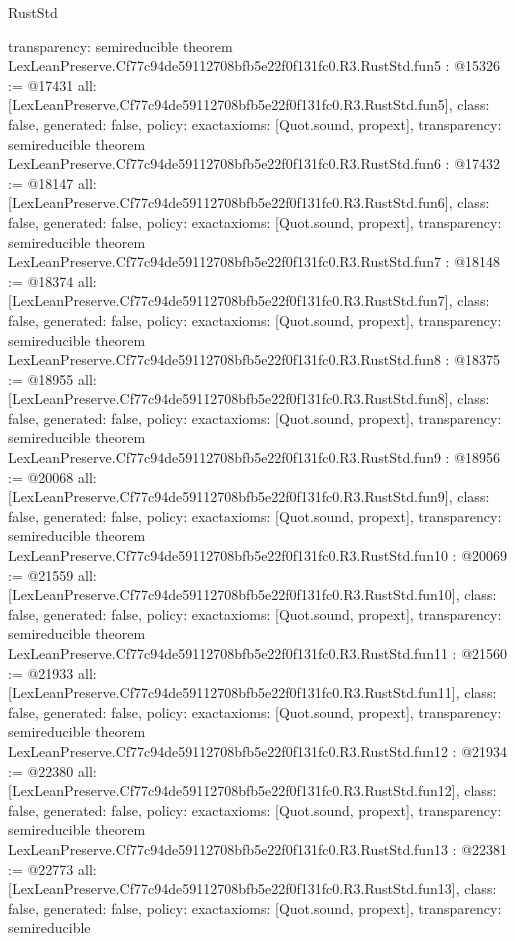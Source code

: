 \begin{lexlean}{RustStd}
\begin{coremodule}
{  transparency: semireducible
}
theorem LexLeanPreserve.Cf77c94de59112708bfb5e22f0f131fc0.R3.RustStd.fun5 : @15326 := @17431 {
  all: [LexLeanPreserve.Cf77c94de59112708bfb5e22f0f131fc0.R3.RustStd.fun5],
  class: false,
  generated: false,
  policy: exact{axioms: [Quot.sound, propext]},
  transparency: semireducible
}
theorem LexLeanPreserve.Cf77c94de59112708bfb5e22f0f131fc0.R3.RustStd.fun6 : @17432 := @18147 {
  all: [LexLeanPreserve.Cf77c94de59112708bfb5e22f0f131fc0.R3.RustStd.fun6],
  class: false,
  generated: false,
  policy: exact{axioms: [Quot.sound, propext]},
  transparency: semireducible
}
theorem LexLeanPreserve.Cf77c94de59112708bfb5e22f0f131fc0.R3.RustStd.fun7 : @18148 := @18374 {
  all: [LexLeanPreserve.Cf77c94de59112708bfb5e22f0f131fc0.R3.RustStd.fun7],
  class: false,
  generated: false,
  policy: exact{axioms: [Quot.sound, propext]},
  transparency: semireducible
}
theorem LexLeanPreserve.Cf77c94de59112708bfb5e22f0f131fc0.R3.RustStd.fun8 : @18375 := @18955 {
  all: [LexLeanPreserve.Cf77c94de59112708bfb5e22f0f131fc0.R3.RustStd.fun8],
  class: false,
  generated: false,
  policy: exact{axioms: [Quot.sound, propext]},
  transparency: semireducible
}
theorem LexLeanPreserve.Cf77c94de59112708bfb5e22f0f131fc0.R3.RustStd.fun9 : @18956 := @20068 {
  all: [LexLeanPreserve.Cf77c94de59112708bfb5e22f0f131fc0.R3.RustStd.fun9],
  class: false,
  generated: false,
  policy: exact{axioms: [Quot.sound, propext]},
  transparency: semireducible
}
theorem LexLeanPreserve.Cf77c94de59112708bfb5e22f0f131fc0.R3.RustStd.fun10 : @20069 := @21559 {
  all: [LexLeanPreserve.Cf77c94de59112708bfb5e22f0f131fc0.R3.RustStd.fun10],
  class: false,
  generated: false,
  policy: exact{axioms: [Quot.sound, propext]},
  transparency: semireducible
}
theorem LexLeanPreserve.Cf77c94de59112708bfb5e22f0f131fc0.R3.RustStd.fun11 : @21560 := @21933 {
  all: [LexLeanPreserve.Cf77c94de59112708bfb5e22f0f131fc0.R3.RustStd.fun11],
  class: false,
  generated: false,
  policy: exact{axioms: [Quot.sound, propext]},
  transparency: semireducible
}
theorem LexLeanPreserve.Cf77c94de59112708bfb5e22f0f131fc0.R3.RustStd.fun12 : @21934 := @22380 {
  all: [LexLeanPreserve.Cf77c94de59112708bfb5e22f0f131fc0.R3.RustStd.fun12],
  class: false,
  generated: false,
  policy: exact{axioms: [Quot.sound, propext]},
  transparency: semireducible
}
theorem LexLeanPreserve.Cf77c94de59112708bfb5e22f0f131fc0.R3.RustStd.fun13 : @22381 := @22773 {
  all: [LexLeanPreserve.Cf77c94de59112708bfb5e22f0f131fc0.R3.RustStd.fun13],
  class: false,
  generated: false,
  policy: exact{axioms: [Quot.sound, propext]},
  transparency: semireducible
}
\end{coremodule}
\end{lexlean}
